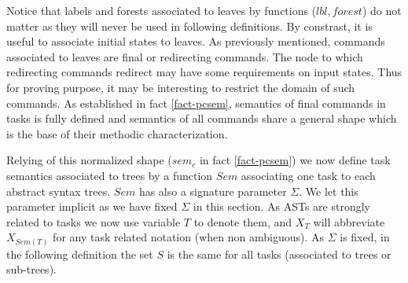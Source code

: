 \documentclass{article}
\begin{document}
Notice that labels and forests associated to leaves by functions ($lbl,forest$) do not matter as they will never be used in following definitions. By constrast, it is useful to associate initial states to leaves. As previously mentioned, commands associated to leaves are final or redirecting commands. The node to which redirecting commands redirect may have some requirements on input states. Thus for proving purpose, it may be interesting to restrict the domain of such commands. As established in fact \ref{fact-pcsem}, semantics of final commands in tasks is fully defined and semantics of all commands share a general shape which is the base of their methodic characterization.


Relying of this normalized shape ($sem_c$ in fact \ref{fact-pcsem}) we now define task semantics associated to trees by a function $Sem$ associating one task to each abstract syntax trees. $Sem$ has also a signature parameter $\Sigma$. We let this parameter implicit as we have fixed $\Sigma$ in this section. As ASTs are strongly related to tasks we now use variable $T$ to denote them, and $X_{T}$ will abbreviate $X_{Sem(T)}$ for any task related notation (when non ambiguous). As $\Sigma$ is fixed, in the following definition the set $S$ is the same for all tasks (associated to trees or sub-trees).

\newcommand{\Mrk}{\mbox{\rm\bfseries\bf[*]}}
\end{document}
